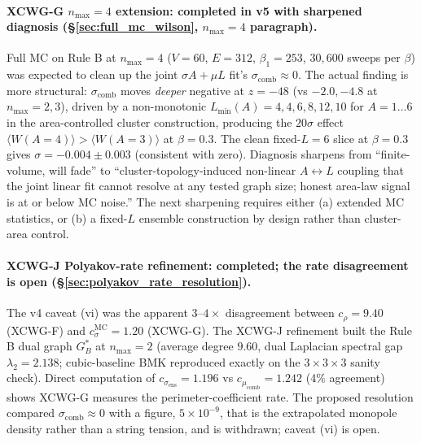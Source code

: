 \documentclass[11pt]{article}
\begin{document}
\paragraph{XCWG-G $n_\text{max}=4$ extension: completed in v5 with sharpened
diagnosis (\S\ref{sec:full_mc_wilson}, $n_\text{max}=4$ paragraph).} Full MC
on Rule B at $n_\text{max}=4$ ($V=60$, $E=312$, $\beta_1=253$, $30{,}600$
sweeps per $\beta$) was expected to clean up the joint $\sigma A+\mu L$
fit's $\sigma_\text{comb}\approx 0$. The actual finding is more structural:
$\sigma_\text{comb}$ moves \emph{deeper} negative at $z=-48$ (vs $-2.0,-4.8$
at $n_\text{max}=2,3$), driven by a non-monotonic
$L_\text{min}(A)=4,4,6,8,12,10$ for $A=1\ldots 6$ in the area-controlled
cluster construction, producing the $20\sigma$ effect
$\langle W(A=4)\rangle>\langle W(A=3)\rangle$ at $\beta=0.3$. The clean
fixed-$L=6$ slice at $\beta=0.3$ gives $\sigma=-0.004\pm 0.003$
(consistent with zero). Diagnosis sharpens from
``finite-volume, will fade'' to ``cluster-topology-induced non-linear
$A\leftrightarrow L$ coupling that the joint linear fit cannot resolve at
any tested graph size; honest area-law signal is at or below MC noise.''
The next sharpening requires either (a) extended MC statistics, or (b) a
fixed-$L$ ensemble construction by design rather than cluster-area control.

\paragraph{XCWG-J Polyakov-rate refinement: completed; the rate
disagreement is open (\S\ref{sec:polyakov_rate_resolution}).} The v4 caveat (vi) was
the apparent $3$--$4\times$ disagreement between $c_\rho=9.40$ (XCWG-F) and
$c_\sigma^\text{MC}=1.20$ (XCWG-G). The XCWG-J refinement built the Rule B
dual graph $G_B^*$ at $n_\text{max}=2$ (average degree $9.60$, dual
Laplacian spectral gap $\lambda_2=2.138$; cubic-baseline BMK reproduced
exactly on the $3\times 3\times 3$ sanity check). Direct computation of
$c_{\sigma_\text{ens}}=1.196$ vs $c_{\mu_\text{comb}}=1.242$ (4\% agreement)
shows XCWG-G measures the perimeter-coefficient rate.  The proposed
resolution compared $\sigma_\text{comb}\approx 0$ with a figure,
$5\times 10^{-9}$, that is the extrapolated monopole density rather than a
string tension, and is withdrawn; caveat (vi) is open.
\end{document}
